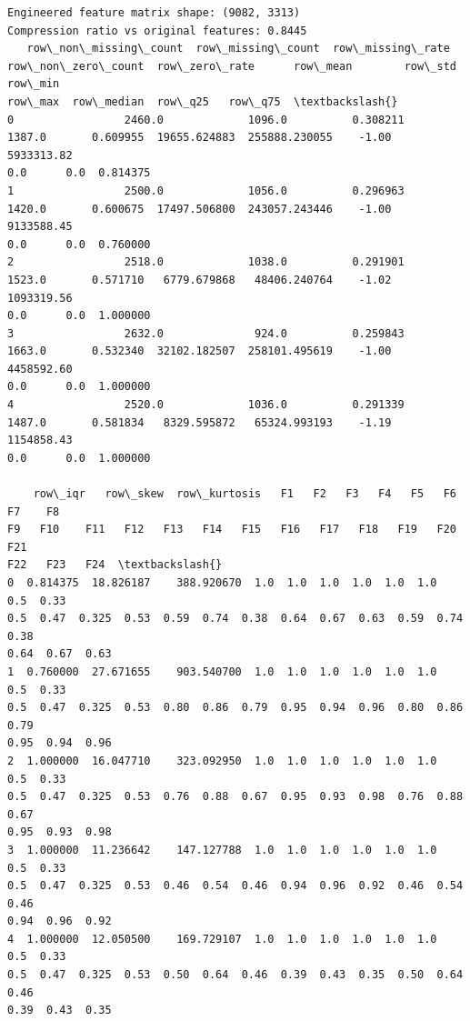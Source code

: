 \documentclass[11pt]{article}
\begin{document}
    \begin{Verbatim}[commandchars=\\\{\}]
Engineered feature matrix shape: (9082, 3313)
Compression ratio vs original features: 0.8445
   row\_non\_missing\_count  row\_missing\_count  row\_missing\_rate
row\_non\_zero\_count  row\_zero\_rate      row\_mean        row\_std  row\_min
row\_max  row\_median  row\_q25   row\_q75  \textbackslash{}
0                 2460.0             1096.0          0.308211
1387.0       0.609955  19655.624883  255888.230055    -1.00  5933313.82
0.0      0.0  0.814375
1                 2500.0             1056.0          0.296963
1420.0       0.600675  17497.506800  243057.243446    -1.00  9133588.45
0.0      0.0  0.760000
2                 2518.0             1038.0          0.291901
1523.0       0.571710   6779.679868   48406.240764    -1.02  1093319.56
0.0      0.0  1.000000
3                 2632.0              924.0          0.259843
1663.0       0.532340  32102.182507  258101.495619    -1.00  4458592.60
0.0      0.0  1.000000
4                 2520.0             1036.0          0.291339
1487.0       0.581834   8329.595872   65324.993193    -1.19  1154858.43
0.0      0.0  1.000000

    row\_iqr   row\_skew  row\_kurtosis   F1   F2   F3   F4   F5   F6   F7    F8
F9   F10    F11   F12   F13   F14   F15   F16   F17   F18   F19   F20   F21
F22   F23   F24  \textbackslash{}
0  0.814375  18.826187    388.920670  1.0  1.0  1.0  1.0  1.0  1.0  0.5  0.33
0.5  0.47  0.325  0.53  0.59  0.74  0.38  0.64  0.67  0.63  0.59  0.74  0.38
0.64  0.67  0.63
1  0.760000  27.671655    903.540700  1.0  1.0  1.0  1.0  1.0  1.0  0.5  0.33
0.5  0.47  0.325  0.53  0.80  0.86  0.79  0.95  0.94  0.96  0.80  0.86  0.79
0.95  0.94  0.96
2  1.000000  16.047710    323.092950  1.0  1.0  1.0  1.0  1.0  1.0  0.5  0.33
0.5  0.47  0.325  0.53  0.76  0.88  0.67  0.95  0.93  0.98  0.76  0.88  0.67
0.95  0.93  0.98
3  1.000000  11.236642    147.127788  1.0  1.0  1.0  1.0  1.0  1.0  0.5  0.33
0.5  0.47  0.325  0.53  0.46  0.54  0.46  0.94  0.96  0.92  0.46  0.54  0.46
0.94  0.96  0.92
4  1.000000  12.050500    169.729107  1.0  1.0  1.0  1.0  1.0  1.0  0.5  0.33
0.5  0.47  0.325  0.53  0.50  0.64  0.46  0.39  0.43  0.35  0.50  0.64  0.46
0.39  0.43  0.35


\end{Verbatim}
\end{document}
